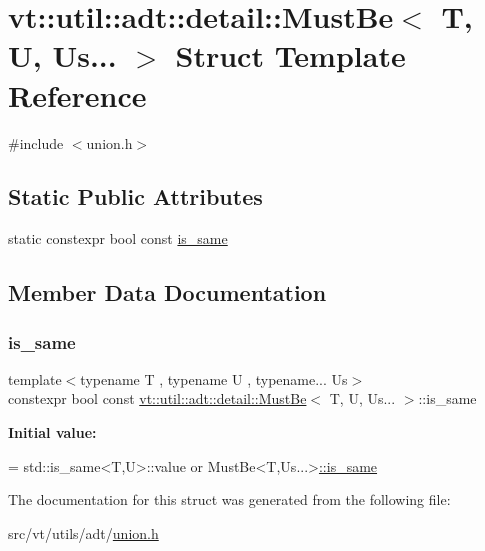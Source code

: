 \hypertarget{structvt_1_1util_1_1adt_1_1detail_1_1_must_be_3_01_t_00_01_u_00_01_us_8_8_8_01_4}{}\section{vt\+:\+:util\+:\+:adt\+:\+:detail\+:\+:Must\+Be$<$ T, U, Us... $>$ Struct Template Reference}
\label{structvt_1_1util_1_1adt_1_1detail_1_1_must_be_3_01_t_00_01_u_00_01_us_8_8_8_01_4}


{\ttfamily \#include $<$union.\+h$>$}

\subsection*{Static Public Attributes}
\begin{DoxyCompactItemize}
\item 
static constexpr bool const \hyperlink{structvt_1_1util_1_1adt_1_1detail_1_1_must_be_3_01_t_00_01_u_00_01_us_8_8_8_01_4_a7b2235c3b5d29130243299e42c2fada4}{is\+\_\+same}
\end{DoxyCompactItemize}


\subsection{Member Data Documentation}
\mbox{\label{structvt_1_1util_1_1adt_1_1detail_1_1_must_be_3_01_t_00_01_u_00_01_us_8_8_8_01_4_a7b2235c3b5d29130243299e42c2fada4}} 
\subsubsection{\texorpdfstring{is\+\_\+same}{is\_same}}
{\footnotesize\ttfamily template$<$typename T , typename U , typename... Us$>$ \\
constexpr bool const \hyperlink{structvt_1_1util_1_1adt_1_1detail_1_1_must_be}{vt\+::util\+::adt\+::detail\+::\+Must\+Be}$<$ T, U, Us... $>$\+::is\+\_\+same\hspace{0.3cm}{\ttfamily [static]}}

{\bfseries Initial value\+:}
\begin{DoxyCode}
=
    std::is\_same<T,U>::value or MustBe<T,Us...>\hyperlink{structvt_1_1util_1_1adt_1_1detail_1_1_must_be_3_01_t_00_01_u_00_01_us_8_8_8_01_4_a7b2235c3b5d29130243299e42c2fada4}{::is\_same}
\end{DoxyCode}


The documentation for this struct was generated from the following file\+:\begin{DoxyCompactItemize}
\item 
src/vt/utils/adt/\hyperlink{union_8h}{union.\+h}\end{DoxyCompactItemize}
